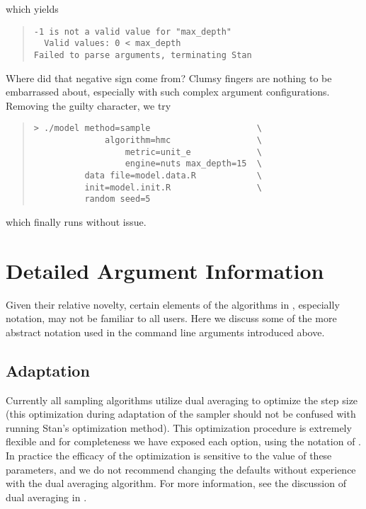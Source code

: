 %
which yields
%
\begin{quote}
\begin{Verbatim}
-1 is not a valid value for "max_depth"
  Valid values: 0 < max_depth
Failed to parse arguments, terminating Stan
\end{Verbatim}
\end{quote}
%
Where did that negative sign come from?  Clumsy fingers are nothing
to be embarrassed about, especially with such complex argument 
configurations.  Removing the guilty character, we try
%
\begin{quote}
\begin{Verbatim}[fontshape=sl]
> ./model method=sample                     \
              algorithm=hmc                 \
                  metric=unit_e             \
                  engine=nuts max_depth=15  \
          data file=model.data.R            \
          init=model.init.R                 \
          random seed=5
\end{Verbatim}
\end{quote}
%
which finally runs without issue.

\section{Detailed Argument Information}\label{detailed-command-arguments.section}

Given their relative novelty, certain elements of the algorithms in \Stan,
especially notation, may not be familiar to all users.  Here we discuss
some of the more abstract notation used in the command line arguments
introduced above.

\subsection{Adaptation}

Currently all \Stan sampling algorithms utilize dual averaging to
optimize the step size (this optimization during adaptation of the
sampler should not be confused with running Stan's optimization method).
This optimization procedure is extremely flexible and for completeness
we have exposed each option, using the notation of
\citep{Hoffman-Gelman:2011, Hoffman-Gelman:2013}.  In practice the
efficacy of the optimization is sensitive to the value of these
parameters, and we do not recommend changing the defaults without
experience with the dual averaging algorithm.  For more information,
see the discussion of dual averaging in \citep{Hoffman-Gelman:2011,
  Hoffman-Gelman:2013}.

